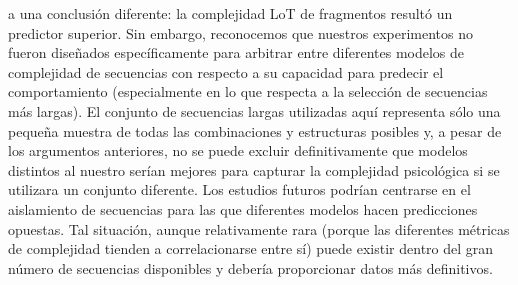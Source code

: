 a una conclusión diferente: la complejidad LoT de fragmentos resultó un predictor superior. Sin embargo, reconocemos que nuestros experimentos no fueron diseñados específicamente para arbitrar entre diferentes modelos de complejidad de secuencias con respecto a su capacidad para predecir el comportamiento (especialmente en lo que respecta a la selección de secuencias más largas). El conjunto de secuencias largas utilizadas aquí representa sólo una pequeña muestra de todas las combinaciones y estructuras posibles y, a pesar de los argumentos anteriores, no se puede excluir definitivamente que modelos distintos al nuestro serían mejores para capturar la complejidad psicológica si se utilizara un conjunto diferente. Los estudios futuros podrían centrarse en el aislamiento de secuencias para las que diferentes modelos hacen predicciones opuestas. Tal situación, aunque relativamente rara (porque las diferentes métricas de complejidad tienden a correlacionarse entre sí) puede existir dentro del gran número de secuencias disponibles y debería proporcionar datos más definitivos.

